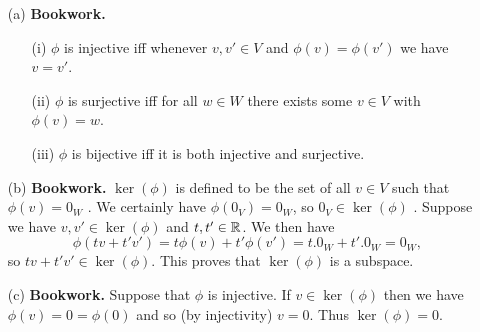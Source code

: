 \documentclass[a4paper]{article}
\begin{document}
\begin{solution}
 \begin{itemize}
  \item[(a)] \textbf{Bookwork.}
   \begin{itemize}
    \item[(i)] $\phi$ is injective iff whenever $v,v'\in V$
     and $\phi(v)=\phi(v')$ we have $v=v'$. 
    \item[(ii)] $\phi$ is surjective iff for all $w\in W$
     there exists some $v\in V$ with $\phi(v)=w$. 
    \item[(iii)] $\phi$ is bijective iff it is both
     injective and surjective. \mk
   \end{itemize}
  \item[(b)] \textbf{Bookwork.} 
   $\ker(\phi)$ is defined to be the set of all
   $v\in V$ such that $\phi(v)=0_W$ .  We certainly have
   $\phi(0_V)=0_W$, so $0_V\in\ker(\phi)$ \mk.  Suppose we have
   $v,v'\in\ker(\phi)$ and $t,t'\in{\mathbb{R}}$.  We then have
   \[ \phi(tv+t'v') = t\phi(v)+t'\phi(v') = 
        t.0_W + t'.0_W = 0_W,
   \]
   so $tv+t'v'\in\ker(\phi)$.  This proves that $\ker(\phi)$
   is a subspace.
  \item[(c)] \textbf{Bookwork.} Suppose that $\phi$ is injective.  If
   $v\in\ker(\phi)$ then we have $\phi(v)=0=\phi(0)$ and so
   (by injectivity) $v=0$.  Thus $\ker(\phi)=0$. 


\end{itemize}
\end{solution}
\end{document}
